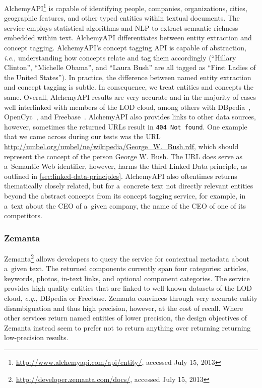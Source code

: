 AlchemyAPI\footnote{\url{http://www.alchemyapi.com/api/entity/},
accessed July 15, 2013}
is capable of identifying people, companies, organizations,
cities, geographic features, and other typed entities within
textual documents.
The service employs statistical algorithms and NLP
to extract semantic richness embedded within text.
AlchemyAPI differentiates between entity extraction and
concept tagging.
AlchemyAPI's concept tagging API is capable of abstraction, \emph{i.e.},
understanding how concepts relate and tag them accordingly
(``Hillary Clinton'', ``Michelle Obama'', and ``Laura Bush'' are all
tagged as ``First Ladies of the United States'').
In practice, the difference between named entity extraction
and concept tagging is subtle.
In consequence, we treat entities and concepts the same.
Overall, AlchemyAPI results are very accurate
and in the majority of cases well interlinked
with members of the LOD cloud,
among others with DBpedia~\cite{auer2007dbpedia},
OpenCyc~\cite{lenat1995cyc},
and Freebase~\cite{bollacker2008freebase,markoff2007freebase}.
AlchemyAPI also provides links to other data sources, however,
sometimes the returned URLs result in \texttt{404 Not found}.
One example that we came across during our tests was the URL
\url{http://umbel.org/umbel/ne/wikipedia/George\_W.\_Bush.rdf}, which should represent the concept of the person George W. Bush.
The URL does serve as a~Semantic Web identifier, however,
harms the third Linked Data principle,
as outlined in \autoref{sec:linked-data-principles}.
AlchemyAPI also oftentimes returns thematically closely related,
but for a~concrete text not directly relevant entities
beyond the abstract concepts from its concept tagging service,
for example, in a~text about the CEO of a~given company,
the name of the CEO of one of its competitors.

\subsubsection{Zemanta}

Zemanta\footnote{\url{http://developer.zemanta.com/docs/},
accessed July 15, 2013}
allows developers to query the service for contextual metadata
about a~given text.
The returned components currently span four categories:
articles, keywords, photos, in-text links, and
optional component categories.
The service provides high quality entities that are linked
to well-known datasets of the LOD cloud, \emph{e.g.},
DBpedia or Freebase.
Zemanta convinces through very accurate entity disambiguation
and thus high precision, however, at the cost of recall.
Where other services return named entities of lower precision,
the design objectives of Zemanta instead seem to prefer
not to return anything over returning returning low-precision results.

